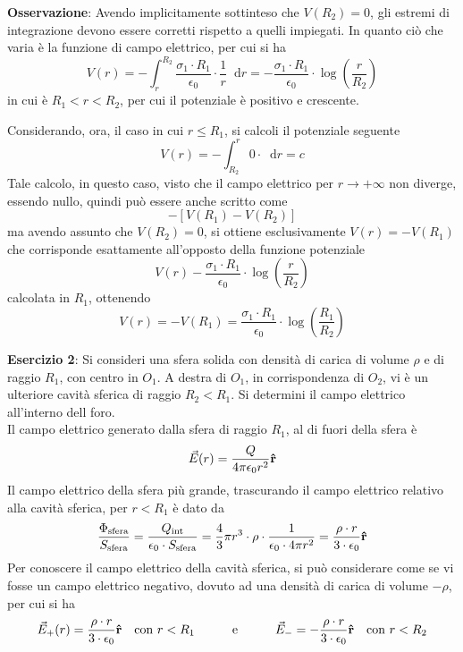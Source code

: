 \documentclass[a4paper]{extarticle}
\newcommand\dif{\mathop{}\!\mathrm{d}}
\begin{document}
\vspace{1em}
\noindent
\textbf{Osservazione}: Avendo implicitamente sottinteso che $V(R_2)=0$, gli estremi di integrazione devono essere corretti rispetto a quelli impiegati. In quanto ciò che varia è la funzione di campo elettrico, per cui si ha 
\[V(r) = -\int_{r}^{R_2} \frac{\sigma_1 \cdot R_1}{\epsilon_0} \cdot \frac{1}{r} \dif r = -\frac{\sigma_1 \cdot R_1}{\epsilon_0} \cdot \log \left(\frac{r}{R_2}\right)\]
in cui è $R_1 < r < R_2$, per cui il potenziale è positivo e crescente.

\vspace{1em}
\noindent
Considerando, ora, il caso in cui $r \leq R_1$, si calcoli il potenziale seguente
\[V(r) = -\int_{R_2}^r 0 \cdot \dif r = c\]
Tale calcolo, in questo caso, visto che il campo elettrico per $r \to +\infty$ non diverge, essendo nullo, quindi può essere anche scritto come
\[- \left[V(R_1)-V(R_2)\right]\]
ma avendo assunto che $V(R_2)=0$, si ottiene esclusivamente $V(r)=-V(R_1)$ che corrisponde esattamente all'opposto della funzione potenziale 
\[V(r)-\frac{\sigma_1 \cdot R_1}{\epsilon_0} \cdot \log \left(\frac{r}{R_2}\right)\]
calcolata in $R_1$, ottenendo
\[V(r)=-V(R_1)=\frac{\sigma_1 \cdot R_1}{\epsilon_0} \cdot \log \left(\frac{R_1}{R_2}\right)\]

\vspace{2em}
\noindent
\textbf{Esercizio 2}: Si consideri una sfera solida con densità di carica di volume $\rho$ e di raggio $R_1$, con centro in $O_1$. A destra di $O_1$, in corrispondenza di $O_2$, vi è un ulteriore cavità sferica di raggio $R_2<R_1$. Si determini il campo elettrico all'interno dell foro.\\
Il campo elettrico generato dalla sfera di raggio $R_1$, al di fuori della sfera è
\[\vec E(r) = \frac{Q}{4 \pi \epsilon_0 r^2} {\bf{\hat r}}\]
Il campo elettrico della sfera più grande, trascurando il campo elettrico relativo alla cavità sferica, per $r<R_1$ è dato da
\[\frac{\Phi_\text{sfera}}{S_\text{sfera}} = \frac{Q_{\text{int}}}{\epsilon_0 \cdot S_\text{sfera}} = \frac{4}{3} \pi r^3 \cdot \rho \cdot \frac{1}{\epsilon_0 \cdot 4 \pi r^2} = \frac{\rho \cdot r}{3 \cdot \epsilon_0} {\bf{\hat r}}\]
Per conoscere il campo elettrico della cavità sferica, si può considerare come se vi fosse un campo elettrico negativo, dovuto ad una densità di carica di volume $-\rho$, per cui si ha
\[\vec{E}_+(r) = \frac{\rho \cdot r}{3 \cdot \epsilon_0} {\bf{\hat r}} \hspace{1em} \text{con } r < R_1 \hspace{3em}  \text{e} \hspace{3em} \vec{E}_- = -\frac{\rho \cdot r}{3 \cdot \epsilon_0} {\bf{\hat r}} \hspace{1em} \text{con } r < R_2\]
\end{document}

